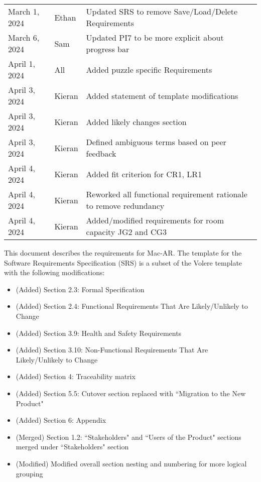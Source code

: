 \documentclass[12pt]{article}
\begin{document}
\begin{table}[hp]
\begin{tabularx}{\textwidth}{llX}
            March 1, 2024 & Ethan & Updated SRS to remove Save/Load/Delete Requirements\\
            March 6, 2024 & Sam & Updated PI7 to be more explicit about progress bar\\
            April 1, 2024 & All & Added puzzle specific Requirements\\
            April 3, 2024 & Kieran & Added statement of template modifications\\
            April 3, 2024 & Kieran & Added likely changes section\\
            April 3, 2024 & Kieran & Defined ambiguous terms based on peer feedback\\
            April 4, 2024 & Kieran & Added fit criterion for CR1, LR1\\
            April 4, 2024 & Kieran & Reworked all functional requirement rationale to remove redundancy\\
            April 4, 2024 & Kieran & Added/modified requirements for room capacity JG2 and CG3\\
		\bottomrule
	\end{tabularx}
\end{table}

\newpage


This document describes the requirements for Mac-AR. The template for the Software Requirements
Specification (SRS) is a subset of the Volere template~\citep{RobertsonAndRobertson2012} with the following modifications:
\begin{itemize}
    \item (Added) Section 2.3: Formal Specification
    \item (Added) Section 2.4: Functional Requirements That Are Likely/Unlikely to Change
    \item (Added) Section 3.9: Health and Safety Requirements
    \item (Added) Section 3.10: Non-Functional Requirements That Are Likely/Unlikely to Change
    \item (Added) Section 4: Traceability matrix
    \item (Added) Section 5.5: Cutover section replaced with ``Migration to the New Product"
    \item (Added) Section 6: Appendix
    \item (Merged) Section 1.2: ``Stakeholders" and ``Users of the Product" sections merged under ``Stakeholders" section
    \item (Modified) Modified overall section nesting and numbering for more logical grouping
\end{itemize}
\end{document}
